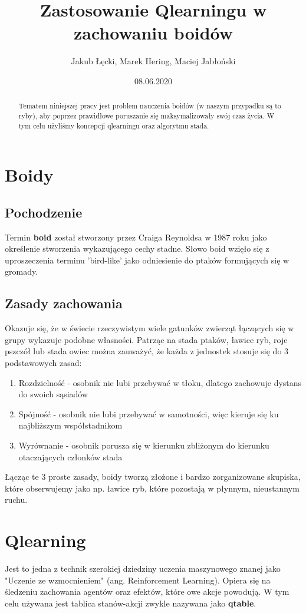 \documentclass{article}
\title{Zastosowanie Qlearningu w zachowaniu boidów}
\author{Jakub Łęcki, Marek Hering, Maciej Jabłoński}
\date{08.06.2020}
\begin{document}
\maketitle
\begin{abstract}
    Tematem niniejszej pracy jest problem nauczenia boidów (w naszym przypadku są to ryby), aby poprzez prawidłowe poruszanie się maksymalizowały swój czas życia. W tym celu użyliśmy koncepcji qlearningu oraz algorytmu stada.
\end{abstract}

\section{Boidy}
\subsection{Pochodzenie}
Termin \textbf{boid} został stworzony przez Craiga Reynoldsa w 1987 roku jako określenie stworzenia wykazującego cechy stadne. Słowo boid wzięło się z uproszeczenia terminu 'bird-like' jako odniesienie do ptaków formujących się w gromady.
\subsection{Zasady zachowania}
Okazuje się, że w świecie rzeczywistym wiele gatunków zwierząt łączących się w grupy wykazuje podobne własności. Patrząc na stada ptaków, ławice ryb, roje pszczół lub stada owiec można zauważyć, że każda z jednostek stosuje się do 3 podstawowych zasad:
\begin{enumerate}
    \item Rozdzielność - osobnik nie lubi przebywać w tłoku, dlatego zachowuje dystans do swoich sąsiadów
    \item Spójność - osobnik nie lubi przebywać w samotności, więc kieruje się ku najbliższym współstadnikom 
    \item Wyrównanie - osobnik porusza się w kierunku zbliżonym do kierunku otaczających członków stada
\end{enumerate}

Łącząc te 3 proste zasady, boidy tworzą złożone i bardzo zorganizowane skupiska, które obserwujemy jako np. ławice ryb, które pozostają w płynnym, nieustannym ruchu.
\section{Qlearning}
Jest to jedna z technik szerokiej dziedziny uczenia maszynowego znanej jako "Uczenie ze wzmocnieniem" (ang. Reinforcement Learning). Opiera się na śledzeniu zachowania agentów oraz efektów, które owe akcje powodują. W tym celu używana jest tablica stanów-akcji zwykle nazywana jako \textbf{qtable}.
\end{document}
